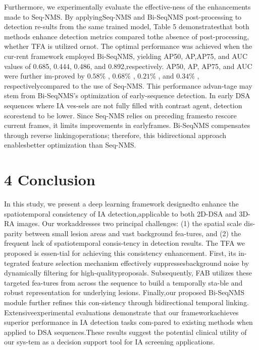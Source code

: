 \documentclass[
  10
]{article}
\begin{document}
Furthermore, we experimentally evaluate the effective-ness of the
enhancements made to Seq-NMS. By applyingSeq-NMS and Bi-SeqNMS
post-processing to detection re-sults from the same trained model, Table
5 demonstratesthat both methods enhance detection metrics compared tothe
absence of post-processing, whether TFA is utilized ornot. The optimal
performance was achieved when the cur-rent framework employed Bi-SeqNMS,
yielding AP50, AP,AP75, and AUC values of 0.685, 0.444, 0.486, and
0.892,respectively. AP50, AP, AP75, and AUC were further im-proved by
\(0 . 5 8 \%\) , \(0 . 6 8 \%\) , \(0 . 2 1 \%\) , and \(0 . 3 4 \%\) ,
respectivelycompared to the use of Seq-NMS. This performance advan-tage
may stem from Bi-SeqNMS's optimization of early-sequence detection. In
early DSA sequences where IA ves-sels are not fully filled with contrast
agent, detection scorestend to be lower. Since Seq-NMS relies on
preceding framesto rescore current frames, it limits improvements in
earlyframes. Bi-SeqNMS compensates through reverse linkingoperations;
therefore, this bidirectional approach enablesbetter optimization than
Seq-NMS.

\section{4 Conclusion}\label{conclusion}

In this study, we present a deep learning framework designedto enhance
the spatiotemporal consistency of IA detection,applicable to both 2D-DSA
and 3D-RA images. Our workaddresses two principal challenges: (1) the
spatial scale dis-parity between small lesion areas and vast background
fea-tures, and (2) the frequent lack of spatiotemporal consis-tency in
detection results. The TFA we proposed is essen-tial for achieving this
consistency enhancement. First, its in-tegrated feature selection
mechanism effectively suppressesbackground noise by dynamically
filtering for high-qualityproposals. Subsequently, FAB utilizes these
targeted fea-tures from across the sequence to build a temporally
sta-ble and robust representation for underlying lesions. Finally,our
proposed Bi-SeqNMS module further refines this con-sistency through
bidirectional temporal linking. Extensiveexperimental evaluations
demonstrate that our frameworkachieves superior performance in IA
detection tasks com-pared to existing methods when applied to DSA
sequences.These results suggest the potential clinical utility of our
sys-tem as a decision support tool for IA screening applications.
\end{document}
